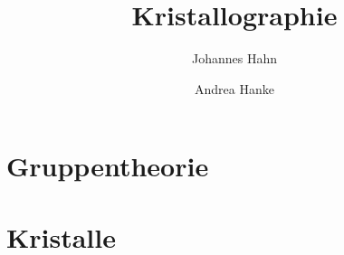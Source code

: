 \documentclass[fontsize=11pt,fleqn,a4paper]{scrartcl}
\title{Kristallographie}
\author{Johannes Hahn \and Andrea Hanke}
\begin{document}
\maketitle

\section{Gruppentheorie}


\pagebreak
\section{Kristalle}

\end{document}
